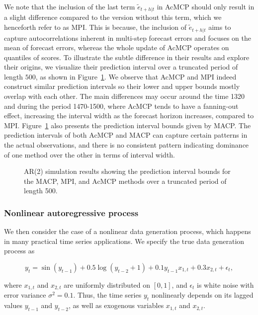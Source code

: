 \documentclass[
  11pt,
  a4paper,
]{article}
\theoremstyle{plain}
\theoremstyle{plain}
\theoremstyle{remark}
\begin{document}
We note that the inclusion of the last term \(\tilde{e}_{t+h|t}\) in
AcMCP should only result in a slight difference compared to the version
without this term, which we henceforth refer to as MPI. This is because,
the inclusion of \(\tilde{e}_{t+h|t}\) aims to capture autocorrelations
inherent in multi-step forecast errors and focuses on the mean of
forecast errors, whereas the whole update of AcMCP operates on quantiles
of scores. To illustrate the subtle difference in their results and
explore their origins, we visualize their prediction interval over a
truncated period of length \(500\), as shown in
Figure~\ref{fig-AR2_timeplot}. We observe that AcMCP and MPI indeed
construct similar prediction intervals so their lower and upper bounds
mostly overlap with each other. The main differences may occur around
the time 1320 and during the period 1470-1500, where AcMCP tends to have
a fanning-out effect, increasing the interval width as the forecast
horizon increases, compared to MPI. Figure~\ref{fig-AR2_timeplot} also
presents the prediction interval bounds given by MACP. The prediction
intervals of both AcMCP and MACP can capture certain patterns in the
actual observations, and there is no consistent pattern indicating
dominance of one method over the other in terms of interval width.

\begin{figure}


\caption{\label{fig-AR2_timeplot}AR(2) simulation results showing the
prediction interval bounds for the MACP, MPI, and AcMCP methods over a
truncated period of length 500.}

\end{figure}%

\subsubsection{Nonlinear autoregressive
process}\label{nonlinear-autoregressive-process}

We then consider the case of a nonlinear data generation process, which
happens in many practical time series applications. We specify the true
data generation process as

\[
y_t = \sin(y_{t-1}) + 0.5\log(y_{t-2} + 1) + 0.1y_{t-1}x_{1,t} + 0.3x_{2,t} + \epsilon_{t},
\]

where \(x_{1,t}\) and \(x_{2,t}\) are uniformly distributed on
\([0,1]\), and \(\epsilon_{t}\) is white noise with error variance
\(\sigma^2 = 0.1\). Thus, the time series \(y_t\) nonlinearly depends on
its lagged values \(y_{t-1}\) and \(y_{t-2}\), as well as exogenous
variables \(x_{1,t}\) and \(x_{2,t}\).
\end{document}
